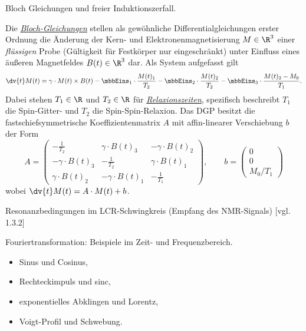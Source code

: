 \documentclass{subfiles}
\begin{document}
    \begin{Frage}
        Bloch Gleichungen und freier Induktionszerfall.
    \end{Frage}
    \begin{Antwort}
        Die \href{https://de.wikipedia.org/wiki/Bloch-Gleichungen}{\emph{Bloch-Gleichungen}} stellen als gewöhnliche Differentialgleichungen erster Ordnung die Änderung der Kern- und Elektronenmagnetisierung $M\in\R^3$ einer \emph{flüssigen} Probe (Gültigkeit für Festkörper nur eingeschränkt) unter Einfluss eines äußeren Magnetfeldes $B(t)\in\R^3$ dar. Als System aufgefasst gilt 
        \[
            \dv{t}M(t) = \gamma\cdot M(t)\times B(t) - \mbbEins_1\cdot\frac{M(t)_1}{T_2} - \mbbEins_2\cdot\frac{M(t)_2}{T_2} - \mbbEins_3\cdot\frac{M(t)_3 - M_0}{T_1}.
        \]
        Dabei stehen $T_1\in\R$ und $T_2\in\R$ für \href{}{\emph{Relaxionszeiten}}, spezifisch beschreibt $T_1$ die Spin-Gitter- und $T_2$ die Spin-Spin-Relaxion. Das DGP besitzt die fastschiefsymmetrische Koeffizientenmatrix $A$ mit affin-linearer Verschiebung $b$ der Form
        \[
            A = \begin{pmatrix}
                -\frac{1}{T_2} & \gamma\cdot B(t)_3 & -\gamma\cdot B(t)_2 \\
                -\gamma\cdot B(t)_3 & -\frac{1}{T_2} & \gamma\cdot B(t)_1 \\
                \gamma\cdot B(t)_2 & -\gamma\cdot B(t)_1 & -\frac{1}{T_1}
            \end{pmatrix},\qquad b = \begin{pmatrix}
                0\\
                0\\
                M_0/T_1
            \end{pmatrix}
        \]
        wobei $\dv{t}M(t) = A\cdot M(t) + b$. \\
    \end{Antwort}

    \begin{Frage}
        Resonanzbedingungen im LCR-Schwingkreis (Empfang des NMR-Signals) [vgl. 1.3.2]
    \end{Frage}
    \begin{Antwort}
        
    \end{Antwort}

    \begin{Frage}
        Fouriertransformation: Beispiele im Zeit- und Frequenzbereich.
        \begin{itemize}[label=$\to$]
            \item Sinus und Cosinus,
            \item Rechteckimpuls und sinc,
            \item exponentielles Abklingen und Lorentz,
            \item Voigt-Profil und Schwebung.
        \end{itemize}
    \end{Frage}
    \begin{Antwort}
        
    \end{Antwort}
\end{document}
